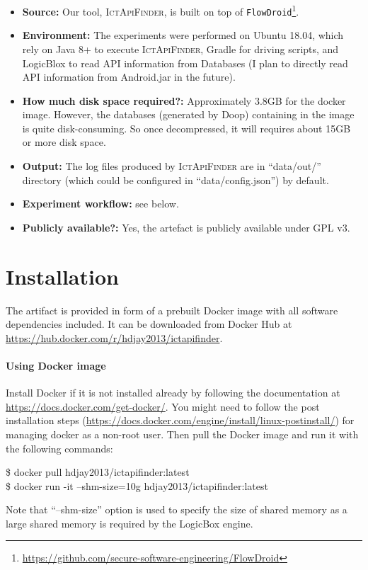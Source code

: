 \documentclass[11pt]{article}
\begin{document}
\begin{itemize}
	\item \textbf{Source:} Our tool, \textsc{IctApiFinder}, is built on top of \texttt{FlowDroid}\footnote{\url{https://github.com/secure-software-engineering/FlowDroid}}.
	\item \textbf{Environment:} The experiments were performed on Ubuntu 18.04, which rely on Java 8+ to execute \textsc{IctApiFinder}, Gradle for driving scripts, and LogicBlox to read API information from Databases (I plan to directly read API information from Android.jar in the future).
	\item \textbf{How much disk space required?:} Approximately 3.8GB for the docker image. However, the databases (generated by Doop) containing in the image is quite disk-consuming. So once decompressed, it will requires about 15GB or more disk space.
	\item \textbf{Output:} The log files produced by \textsc{IctApiFinder} are in ``data/out/'' directory (which could be configured in ``data/config.json'') by default.
	\item \textbf{Experiment workflow:} see below.
	\item \textbf{Publicly available?:} Yes, the artefact is publicly available under GPL v3.
\end{itemize}

\section{Installation}
The artifact is provided in form of a prebuilt Docker image with all software dependencies included. It can be downloaded from Docker Hub at \url{https://hub.docker.com/r/hdjay2013/ictapifinder}. 

\paragraph{Using Docker image} Install Docker if it is not installed already by following the documentation at \url{https://docs.docker.com/get-docker/}. You might need to follow the post
installation steps (\url{https://docs.docker.com/engine/install/linux-postinstall/}) for managing docker as a non-root user. Then pull the Docker image and run it with the following commands:
\begin{framed}
	\noindent\$ docker pull hdjay2013/ictapifinder:latest\\
	\noindent\$ docker run -it --shm-size=10g hdjay2013/ictapifinder:latest
\end{framed}
Note that ``--shm-size'' option is used to specify the size of shared memory as a large shared memory is required by the LogicBox engine. 
\end{document}

